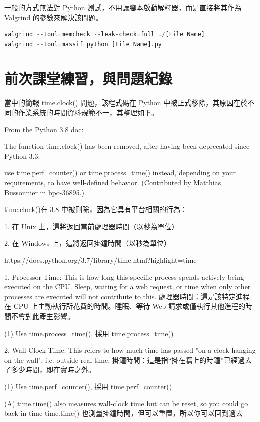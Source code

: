 \documentclass[10pt,UTF8]{ctexart}
\begin{document}
一般的方式無法對 Python 測試，不用讓腳本啟動解釋器，而是直接將其作為 Valgrind 的參數來解決該問題。

\begin{lstlisting}[language={python}]
valgrind --tool=memcheck --leak-check=full ./[File Name]
valgrind --tool=massif python [File Name].py
\end{lstlisting}

\section{前次課堂練習，與問題紀錄}

當中的簡報 time.clock() 問題，該程式碼在 Python 中被正式移除，其原因在於不同的作業系統的時間資料規範不一，其整理如下。


From the Python 3.8 doc:

The function time.clock() has been removed, after having been deprecated since Python 3.3: 

use time.perf\_counter() or time.process\_time() instead, depending on your requirements, to have well-defined behavior. (Contributed by Matthias Bussonnier in bpo-36895.)

time.clock()在 3.8 中被刪除，因為它具有平台相關的行為：

1. 在 Unix 上，這將返回當前處理器時間（以秒為單位）

2. 在 Windows 上，這將返回掛鐘時間（以秒為單位）

https://docs.python.org/3.7/library/time.html?highlight=time%

1. Processor Time: This is how long this specific process spends actively being executed on the CPU. Sleep, waiting for a web request, or time when only other processes are executed will not contribute to this.
處理器時間：這是該特定進程在 CPU 上主動執行所花費的時間。睡眠、等待 Web 請求或僅執行其他進程的時間不會對此產生影響。


(1) Use time.process\_time(), 採用 time.process\_time()


2. Wall-Clock Time: This refers to how much time has passed "on a clock hanging on the wall", i.e. outside real time.
掛鐘時間：這是指“掛在牆上的時鐘”已經過去了多少時間，即在實時之外。


(1) Use time.perf\_counter(), 採用 time.perf\_counter()


(A) time.time() also measures wall-clock time but can be reset, so you could go back in time
  time.time() 也測量掛鐘時間，但可以重置，所以你可以回到過去
\end{document}
